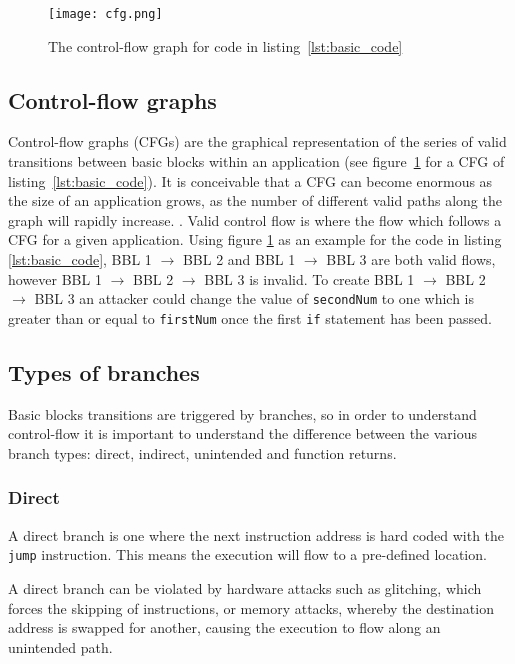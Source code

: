 \begin{figure}
  \centering
  \vspace*{0.5in}
  \texttt{[image: cfg.png]}
  \caption{The control-flow graph for code in listing~\ref{lst:basic_code}}
  \label{fig:basicCFG}
\end{figure}

\subsection{Control-flow graphs}
Control-flow graphs (CFGs) are the graphical representation of the series of valid transitions between basic blocks within an application (see figure~\ref{fig:basicCFG} for a CFG of listing~\ref{lst:basic_code}). It is conceivable that a CFG can become enormous as the size of an application grows, as the number of different valid paths along the graph will rapidly increase.
\ifnotesincluded
{}
\fi. Valid control flow is where the flow which follows a CFG for a given application. Using figure \ref{fig:basicCFG} as an example for the code in listing \ref{lst:basic_code}, BBL 1 $\rightarrow$ BBL 2 and BBL 1 $\rightarrow$ BBL 3 are both valid flows, however BBL 1 $\rightarrow$ BBL 2 $\rightarrow$ BBL 3 is invalid. To create BBL 1 $\rightarrow$ BBL 2 $\rightarrow$ BBL 3 an attacker could change the value of \verb|secondNum| to one which is greater than or equal to \verb|firstNum| once the first \verb|if| statement has been passed. 

\subsection{Types of branches}
Basic blocks transitions are triggered by branches, so in order to understand control-flow it is important to understand the difference between the various branch types: direct, indirect, unintended and function returns.

\subsubsection*{Direct}
A direct branch is one where the next instruction address is hard coded with the \verb|jump| instruction. This means the execution will flow to a pre-defined location.

A direct branch can be violated by hardware attacks such as glitching, which forces the skipping of instructions, or memory attacks, whereby the destination address is swapped for another, causing the execution to flow along an unintended path.

